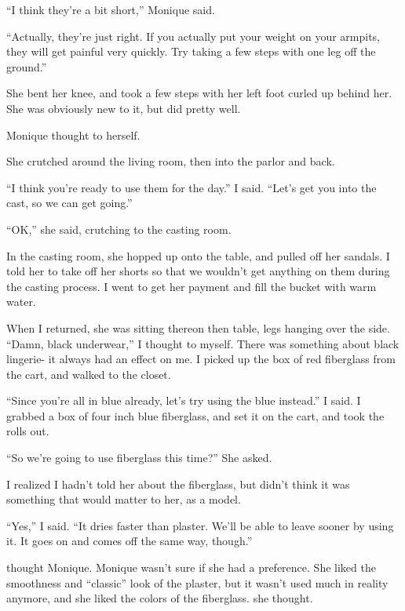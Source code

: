 ``I think they're a bit short,'' Monique said.

``Actually, they're just right. If you actually put your weight on your armpits, they will
get painful very quickly. Try taking a few steps with one leg off the ground.''

She bent her knee, and took a few steps with her left foot curled up behind her. She was
obviously new to it, but did pretty well.

 Monique thought to herself. 

She crutched around the living room, then into the parlor and back.

``I think you're ready to use them for the day.'' I said. ``Let's get you into the cast, so
we can get going.''

``OK,'' she said, crutching to the casting room.

In the casting room, she hopped up onto the table, and pulled off her sandals. I told her to
take off her shorts so that we wouldn't get anything on them during the casting process. I went
to get her payment and fill the bucket with warm water.

When I returned, she was sitting thereon then table, legs hanging over the side. ``Damn,
black underwear,'' I thought to myself. There was something about black lingerie- it always had
an effect on me. I picked up the box of red fiberglass from the cart, and walked to the closet.

``Since you're all in blue already, let's try using the blue instead.'' I said. I grabbed a
box of four inch blue fiberglass, and set it on the cart, and took the rolls out.

``So we're going to use fiberglass this time?'' She asked.

I realized I hadn't told her about the fiberglass, but didn't think it was something that
would matter to her, as a model.

``Yes,'' I said. ``It dries faster than plaster. We'll be able to leave sooner by using it.
It goes on and comes off the same way, though.''

 thought Monique.  Monique wasn't
sure if she had a preference. She liked the smoothness and ``classic'' look of the plaster, but
it wasn't used much in reality anymore, and she liked the colors of the fiberglass.  she thought.

